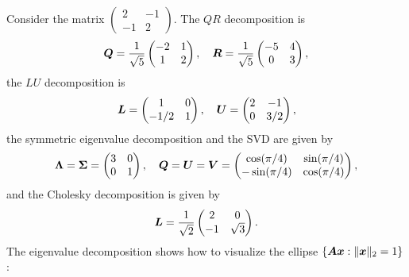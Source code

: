 \documentclass[11pt,a4paper]{memoir}
\begin{document}
\begin{example}
Consider the matrix $
  \begin{pmatrix}
    2 & -1\\ -1 & 2
  \end{pmatrix}$.
The $QR$ decomposition is
\begin{equation*}
\bm{Q} = \frac{1}{\sqrt{5}}\begin{pmatrix}
-2 & 1\\
1 & 2
\end{pmatrix}, \quad
\bm{R} = \frac{1}{\sqrt{5}}\begin{pmatrix}
-5 & 4\\
0 & 3
\end{pmatrix},
\end{equation*}
the $LU$ decomposition is
\begin{equation*}
\bm{L} = \begin{pmatrix}
1 & 0\\
-1/2 & 1
\end{pmatrix}, \quad
\bm{U} = \begin{pmatrix}
  2 & -1\\
  0 & 3/2
\end{pmatrix},
\end{equation*}
the symmetric eigenvalue decomposition and the SVD are given by
\begin{equation*}
 \bm{\Lambda} = \bm{\Sigma} = \begin{pmatrix}
 3 & 0\\
 0 & 1
 \end{pmatrix}, \quad
 \bm{Q} = \bm{U} = \bm{V} = \begin{pmatrix}
 \cos(\pi/4) & \sin(\pi/4)\\
 -\sin(\pi/4) & \cos(\pi/4)
 \end{pmatrix},
\end{equation*}
and the Cholesky decomposition is given by
\begin{equation*}
\bm{L} = \frac{1}{\sqrt{2}}\begin{pmatrix}
2 & 0\\
-1 & \sqrt{3}
\end{pmatrix}.
\end{equation*}
The eigenvalue decomposition shows how to visualize the ellipse $\{\bm{A}\bm{x} \mathrel{\mathop{:}} \Vert {\bm{x}}\Vert_2=1\}$: 
\begin{figure}[ht!]
\centering
{}
\end{figure}
\end{example}
\end{document}
